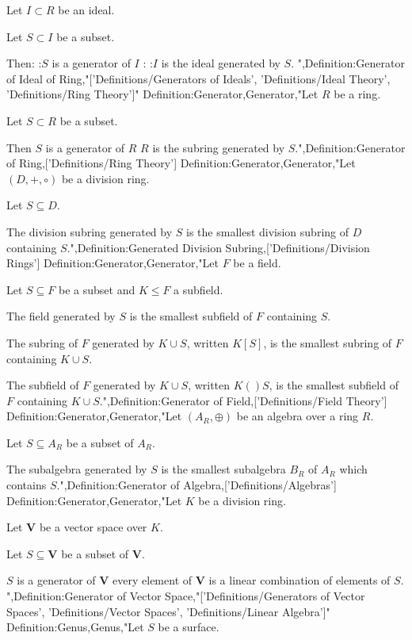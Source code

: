 Let $I \subset R$ be an ideal.

Let $S \subset I$ be a subset.


Then:
:$S$ is a generator of $I$
:
:$I$ is the ideal generated by $S$.
",Definition:Generator of Ideal of Ring,"['Definitions/Generators of Ideals', 'Definitions/Ideal Theory', 'Definitions/Ring Theory']"
Definition:Generator,Generator,"Let $R$ be a ring.

Let $S \subset R$ be a subset.


Then $S$ is a generator of $R$  $R$ is the subring generated by $S$.",Definition:Generator of Ring,['Definitions/Ring Theory']
Definition:Generator,Generator,"Let $\left( D, +, \circ \right)$ be a division ring.

Let $S \subseteq D$.


The division subring generated by $S$ is the smallest division subring of $D$ containing $S$.",Definition:Generated Division Subring,['Definitions/Division Rings']
Definition:Generator,Generator,"Let $F$ be a field.

Let $S \subseteq F$ be a subset and $K \le F$ a subfield.


The field generated by $S$ is the smallest subfield of $F$ containing $S$.

The subring of $F$ generated by $K \cup S$, written $K \left[ S \right]$, is the smallest subring of $F$ containing $K \cup S$.

The subfield of $F$ generated by $K \cup S$, written $K \left(   \right)S$, is the smallest subfield of $F$ containing $K \cup S$.",Definition:Generator of Field,['Definitions/Field Theory']
Definition:Generator,Generator,"Let $\left( A_R, \oplus \right)$ be an algebra over a ring $R$.

Let $S \subseteq A_R$ be a subset of $A_R$.


The subalgebra generated by $S$ is the smallest subalgebra $B_R$ of $A_R$ which contains $S$.",Definition:Generator of Algebra,['Definitions/Algebras']
Definition:Generator,Generator,"Let $K$ be a division ring.

Let $\mathbf V$ be a vector space over $K$.

Let $S \subseteq \mathbf V$ be a subset of $\mathbf V$.


$S$ is a generator of $\mathbf V$  every element of $\mathbf V$ is a linear combination of elements of $S$.
",Definition:Generator of Vector Space,"['Definitions/Generators of Vector Spaces', 'Definitions/Vector Spaces', 'Definitions/Linear Algebra']"
Definition:Genus,Genus,"Let $S$ be a surface.

